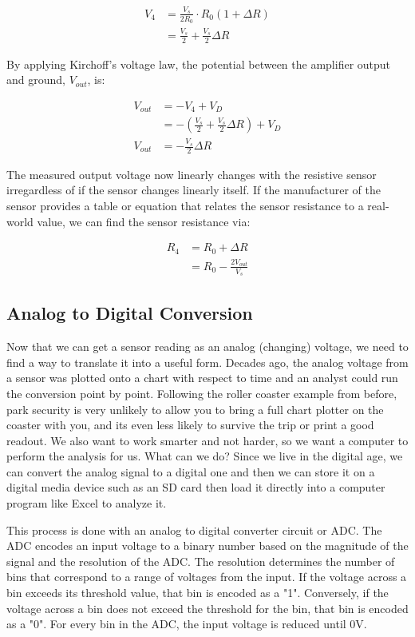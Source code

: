 \begin{align*}
    V_4 &= \frac{V_s}{2R_0} \cdot R_0(1+\Delta R) \\
        &= \frac{V_s}{2} + \frac{V_s}{2} \Delta R
\end{align*}

By applying Kirchoff's voltage law, the potential between the amplifier output and ground, $V_{out} $, is:

\begin{align*}
    V_{out} &= -V_4 + V_D \\
            &= -\left( \frac{V_s}{2} + \frac{V_s}{2} \Delta R\right) + V_D \\
    V_{out} &= -\frac{V_s}{2} \Delta R
\end{align*}

The measured output voltage now linearly changes with the resistive sensor irregardless of if the sensor changes linearly itself.
If the manufacturer of the sensor provides a table or equation that relates the sensor resistance to a real-world value, we can find the sensor resistance via:

\begin{align*}
    R_4 &= R_0 + \Delta R \\
        &= R_0 - \frac{2V_{out}}{V_s}
\end{align*}

\subsection{Analog to Digital Conversion} \label{ssec:analog_to_digital_conversion}
Now that we can get a sensor reading as an analog (changing) voltage, we need to find a way to translate it into a useful form.
Decades ago, the analog voltage from a sensor was plotted onto a chart with respect to time and an analyst could run the conversion point by point.
Following the roller coaster example from before, park security is very unlikely to allow you to bring a full chart plotter on the coaster with you, and its even less likely to survive the trip or print a good readout.
We also want to work smarter and not harder, so we want a computer to perform the analysis for us. 
What can we do?
Since we live in the digital age, we can convert the analog signal to a digital one and then we can store it on a digital media device such as an SD card then load it directly into a computer program like Excel to analyze it.

This process is done with an analog to digital converter circuit or ADC. 
The ADC encodes an input voltage to a binary number based on the magnitude of the signal and the resolution of the ADC.
The resolution determines the number of bins that correspond to a range of voltages from the input. 
If the voltage across a bin exceeds its threshold value, that bin is encoded as a "1".
Conversely, if the voltage across a bin does not exceed the threshold for the bin, that bin is encoded as a "0".
For every bin in the ADC, the input voltage is reduced until 0V.

